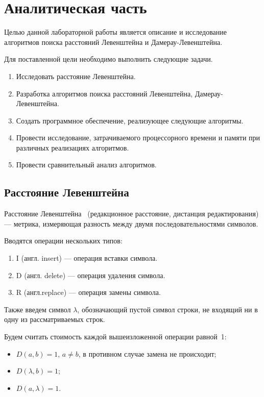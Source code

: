 \chapter{Аналитическая часть}
\label{sec:targets}
Целью данной лабораторной работы является описание и исследование алгоритмов поиска расстояний Левенштейна и Дамерау-Левенштейна.


Для поставленной цели необходимо выполнить следующие задачи.
\begin{enumerate}[label={\arabic*)}]
	\item Исследовать расстояние Левенштейна.
	\item Разработка алгоритмов поиска расстояний Левенштейна, Дамерау-Левенштейна.
	\item Создать программное обеспечение, реализующее следующие алгоритмы.
	\item Провести исследование, затрачиваемого процессорного времени и памяти при различных реализациях алгоритмов.
	\item Провести сравнительный анализ алгоритмов.
\end{enumerate}

\section{Расстояние Левенштейна}


Расстояние Левенштейна~\cite{levenshtein} (редакционное расстояние, дистанция редактирования) --- метрика, измеряющая разность между двумя последовательностями символов.

Вводятся операции нескольких типов:
\begin{enumerate}[label=\arabic*.]
	\item I (англ. insert) --- операция вставки символа.
	\item D (англ. delete) --- операция удаления символа.
	\item R (англ.replace) --- операция замены символа.
\end{enumerate}
Также введем символ $\lambda$, обозначающий пустой символ строки, не входящий ни в одну из рассматриваемых строк.

Будем считать стоимость каждой вышеизложенной операции равной~1:
\begin{itemize}[label=---]
	\item $D(a, b) = 1$, $a \neq b$, в противном случае замена не происходит;
	\item $D(\lambda, b) = 1$;
	\item $D(a, \lambda) = 1$.
\end{itemize}


